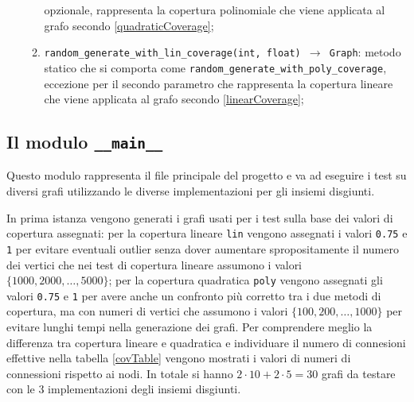 \begin{enumerate}
\begin{enumerate}[resume]
                        opzionale, rappresenta la copertura polinomiale che viene applicata al grafo secondo \eqref{quadraticCoverage};
                  \item \texttt{random\_generate\_with\_lin\_coverage(int, float) $\rightarrow$ Graph}: metodo statico che si comporta come
                        \texttt{random\_generate\_with\_poly\_coverage}, eccezione per il secondo parametro che rappresenta la copertura lineare
                        che viene applicata al grafo secondo \eqref{linearCoverage};
            \end{enumerate}
\end{enumerate}

\subsection{Il modulo \texttt{\_\_main\_\_}}
Questo modulo rappresenta il file principale del progetto e va ad eseguire i test su diversi grafi utilizzando
le diverse implementazioni per gli insiemi disgiunti.\newline

In prima istanza vengono generati i grafi usati per i test sulla base dei valori di copertura assegnati: per la copertura lineare \texttt{lin}
vengono assegnati i valori \texttt{0.75} e \texttt{1} per evitare eventuali outlier senza dover aumentare spropositamente il numero dei vertici
che nei test di copertura lineare assumono i valori $\{1000, 2000, \ldots, 5000\}$; per la copertura quadratica \texttt{poly} vengono assegnati
gli valori \texttt{0.75} e \texttt{1} per avere anche un confronto più corretto tra i due metodi di copertura, ma con numeri di vertici che
assumono i valori $\{100, 200, \ldots, 1000\}$ per evitare lunghi tempi nella generazione dei grafi. Per comprendere meglio la differenza tra copertura
lineare e quadratica e individuare il numero di connesioni effettive nella tabella \ref{covTable} vengono mostrati i valori di numeri di connessioni
rispetto ai nodi. In totale si hanno $2 \cdot 10 + 2 \cdot 5 = 30$ grafi da testare con le 3 implementazioni degli insiemi disgiunti.\newline

